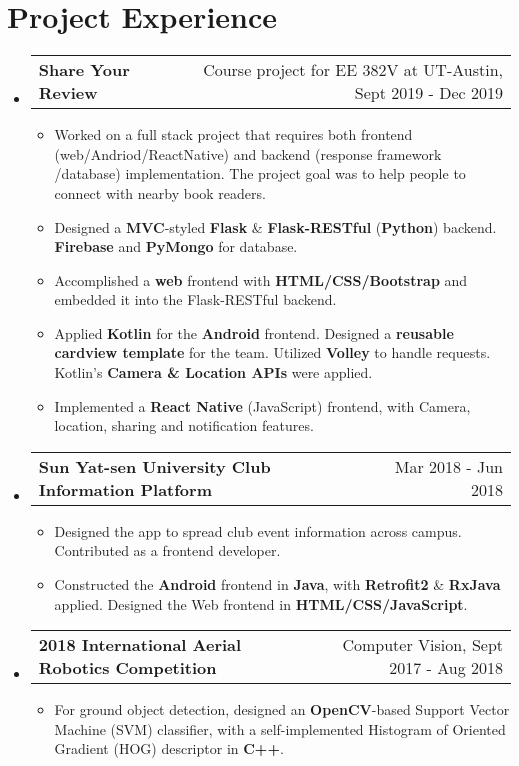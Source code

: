 \documentclass[letterpaper,11pt]{article}
\makeatletter
\newcommand{\resumeItem}[1]{
  \item\small{
    {#1 \vspace{-2pt}}
  }
}
\newcommand{\internSubheading}[2]{
	\vspace{-1pt}\item
	\begin{tabular*}{0.97\textwidth}[t]{l@{\extracolsep{\fill}}r}
		\textbf{#1} & #2 \\
	\end{tabular*}\vspace{-6.5pt}
}
\newcommand{\resumeSubHeadingListStart}{\begin{itemize}[leftmargin=*]}
\newcommand{\resumeSubHeadingListEnd}{\end{itemize}}
\newcommand{\resumeItemListStart}{\begin{itemize}}
\newcommand{\resumeItemListEnd}{\end{itemize}\vspace{-5pt}}
\makeatother
\begin{document}
\section{Project Experience}
	\resumeSubHeadingListStart
	\internSubheading
	{Share Your Review}{Course project for EE 382V at UT-Austin, Sept 2019 - Dec 2019}
	\resumeItemListStart
	\resumeItem
	{Worked on a full stack project that requires both frontend (web/Andriod/ReactNative) and backend (response framework /database) implementation. The project goal was to help people to connect with nearby book readers.}
	\resumeItem
	{Designed a \textbf{MVC}-styled \textbf{Flask} \& \textbf{Flask-RESTful} (\textbf{Python}) backend. \textbf{Firebase} and \textbf{PyMongo} for database. }
	\resumeItem
	{Accomplished a \textbf{web} frontend with \textbf{HTML/CSS/Bootstrap} and embedded it into the Flask-RESTful backend.}
	\resumeItem
	{Applied \textbf{Kotlin} for the \textbf{Android} frontend. Designed a \textbf{reusable cardview template} for the team. Utilized \textbf{Volley} to handle requests. Kotlin's \textbf{Camera \& Location APIs} were applied.  }
	\resumeItem
	{Implemented a \textbf{React Native} (JavaScript) frontend, with Camera, location, sharing and notification features. }
	\resumeItemListEnd
	
	\internSubheading{Sun Yat-sen University Club Information Platform}{Mar 2018 - Jun 2018}
	\resumeItemListStart
	\resumeItem{Designed the app to spread club event information across campus. Contributed as a frontend developer.}
	\resumeItem{Constructed the \textbf{Android} frontend in \textbf{Java}, with \textbf{Retrofit2} \& \textbf{RxJava} applied. Designed the Web frontend in \textbf{HTML/CSS/JavaScript}. }		
	\resumeItemListEnd
	\internSubheading{2018 International Aerial Robotics Competition}{Computer Vision, Sept 2017 - Aug 2018}
	\resumeItemListStart
	\resumeItem{For ground object detection, designed an \textbf{OpenCV}-based Support Vector Machine (SVM) classifier, with a self-implemented Histogram of Oriented Gradient (HOG) descriptor in \textbf{C++}. }
	\resumeItemListEnd
  \resumeSubHeadingListEnd
  
\end{document}
